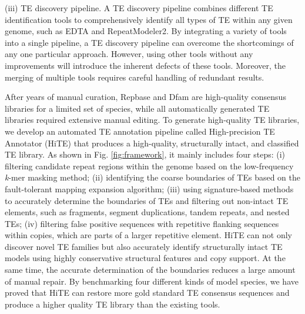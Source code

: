 \documentclass{bmcart}
\begin{document}
(iii) TE discovery pipeline. A TE discovery pipeline combines different TE identification tools to comprehensively identify all types of TE within any given genome, such as EDTA\cite{ou2019benchmarking} and RepeatModeler2\cite{flynn2020repeatmodeler2}. By integrating a variety of tools into a single pipeline, a TE discovery pipeline can overcome the shortcomings of any one particular approach. However, using other tools without any improvements will introduce the inherent defects of these tools. Moreover, the merging of multiple tools requires careful handling of redundant results.

After years of manual curation, Repbase\cite{bao2015repbase} and Dfam\cite{hubley2016dfam} are high-quality consensus libraries for a limited set of species, while all automatically generated TE libraries required extensive manual editing. To generate high-quality TE libraries, we develop an automated TE annotation pipeline called High-precision TE Annotator (HiTE) that produces a high-quality, structurally intact, and classified TE library. As shown in Fig. \ref{fig:framework}, it mainly includes four steps: (i) filtering candidate repeat regions within the genome based on the low-frequency \emph{k}-mer masking method; (ii) identifying the coarse boundaries of TEs based on the fault-tolerant mapping expansion algorithm; (iii) using signature-based methods to accurately determine the boundaries of TEs and filtering out non-intact TE elements, such as fragments, segment duplications, tandem repeats, and nested TEs; (iv) filtering false positive sequences with repetitive flanking sequences within copies, which are parts of a larger repetitive element. HiTE can not only discover novel TE families but also accurately identify structurally intact TE models using highly conservative structural features and copy support. At the same time, the accurate determination of the boundaries reduces a large amount of manual repair. By benchmarking four different kinds of model species, we have proved that HiTE can restore more gold standard TE consensus sequences and produce a higher quality TE library than the existing tools.

\end{document}
